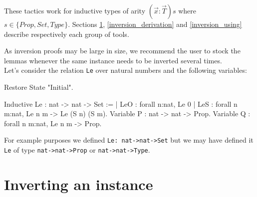 These tactics work for inductive types of arity $(\vec{x}:\vec{T})s$ 
where $s \in \{Prop,Set,Type\}$. Sections \ref{inversion_primitive},
\ref{inversion_derivation} and \ref{inversion_using} 
describe respectively each group of tools.

As inversion proofs may be large in size, we recommend the user to
stock the lemmas whenever the same instance needs to be inverted
several times.\\

Let's consider the relation \texttt{Le} over natural numbers and the
following variables:

\begin{coq_eval}
Restore State "Initial".
\end{coq_eval}

\begin{coq_example*}
Inductive Le : nat -> nat -> Set :=
  | LeO : forall n:nat, Le 0%
  | LeS : forall n m:nat, Le n m -> Le (S n) (S m).
Variable P : nat -> nat -> Prop.
Variable Q : forall n m:nat, Le n m -> Prop.
\end{coq_example*}

For example purposes we defined  \verb+Le: nat->nat->Set+
 but we may have defined
it \texttt{Le} of type \verb+nat->nat->Prop+ or \verb+nat->nat->Type+.


\section{Inverting an instance}
\label{inversion_primitive}
